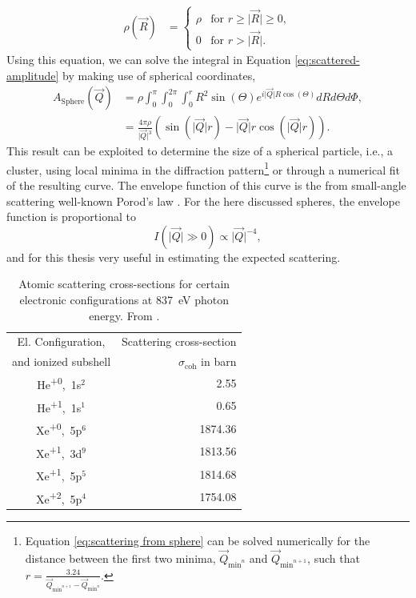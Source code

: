 \begin{align}
\rho\left(\vec{R}\right)&=\begin{cases}
\rho& \text{for $r \geq \lvert\vec{R}\rvert \geq 0$},\\
0&\text{for $r > \lvert\vec{R}\rvert$}.
\end{cases}
\label{eq:el-density}
\end{align}
Using this equation, we can solve the integral in Equation \eqref{eq:scattered-amplitude} by making use of spherical coordinates,
\begin{align}
A_{\text{Sphere}}\left(\vec{Q}\right) &= \rho \int_{0}^{\pi}\int_{0}^{2\pi}\int_{0}^{r} R^{2}  \sin\left(\Theta\right) e^{i \lvert\vec{Q}\rvert R \cos\left(\Theta\right)} dR d\Theta d\Phi,\\
&=\frac{4 \pi \rho}{\lvert\vec{Q}\rvert^{3}}\left(\sin\left(\lvert\vec{Q}\rvert r\right)-\lvert\vec{Q}\rvert r\cos\left(\lvert\vec{Q}\rvert r\right)\right).
\label{eq:scattering from sphere}
\end{align}
This result can be exploited to determine the size of a spherical particle, i.e., a cluster, using local minima in the diffraction pattern\footnote{Equation \eqref{eq:scattering from sphere} can be solved numerically for the distance between the first two minima, $\vec{Q}_{\text{min}^{n}}$ and $\vec{Q}_{\text{min}^{n+1}}$, such that $r=\frac{3.24}{\vec{Q}_{\text{min}^{n+1}}-\vec{Q}_{\text{min}^{n}}}$.} or through a numerical fit of the resulting curve. The envelope function of this curve is the from small-angle scattering well-known Porod's law \cite{Sinha-1988-PRB}. For the here discussed spheres, the envelope function is proportional to
\begin{equation}
I(\lvert\vec{Q}\rvert \gg 0)\propto \lvert\vec{Q}\rvert^{-4},
\label{eq:porods-law}
\end{equation}
and for this thesis very useful in estimating the expected scattering.\\[1\baselineskip]
%
\begin{table}
	\centering
		\begin{tabular}{ | c | r | }
		\hline
			El. Configuration, & Scattering cross-section \\
			and ionized subshell & $\sigma_{\text{coh}}$ in barn \\ \hline
			He\textsuperscript{+0},\ 1s$^{2}$ & 2.55  \\ \hline
			He\textsuperscript{+1},\ 1s$^{1}$ & 0.65  \\ \hline
			Xe\textsuperscript{+0},\ 5p$^{6}$ & 1874.36  \\ \hline
			Xe\textsuperscript{+1},\ 3d$^{9}$ & 1813.56  \\ \hline
			Xe\textsuperscript{+1},\ 5p$^{5}$ & 1814.68  \\ \hline
			Xe\textsuperscript{+2},\ 5p$^{4}$ & 1754.08  \\ \hline
		\end{tabular}
	\caption[Atomic scattering factors for helium and xenon.]{Atomic scattering cross-sections for certain electronic configurations at \SI{837}{\electronvolt} photon energy. From \citep{Ho-2016-PC}.}
	\label{tab:helium-xenon-el-scattering-crossection}
\end{table}
